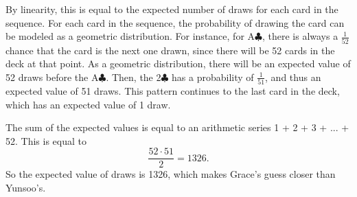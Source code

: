 \documentclass[12pt]{exam}
\begin{document}
\begin{solution}
    By linearity, this is equal to the expected number of draws for each card in the sequence. For each card in the sequence, the probability of drawing the card can be modeled as a geometric distribution. For instance, for A$\clubsuit$, there is always a $\frac{1}{52}$ chance that the card is the next one drawn, since there will be 52 cards in the deck at that point. As a geometric distribution, there will be an expected value of 52 draws before the A$\clubsuit$. Then, the 2$\clubsuit$ has a probability of $\frac{1}{51}$, and thus an expected value of 51 draws. This pattern continues to the last card in the deck, which has an expected value of 1 draw.
    \par The sum of the expected values is equal to an arithmetic series 1 + 2 + 3 + ... + 52. This is equal to 
    \[ \frac{52 \cdot 51}{2} = 1326. \]
    So the expected value of draws is 1326, which makes Grace's guess closer than Yunsoo's.
\end{solution}
\end{document}
